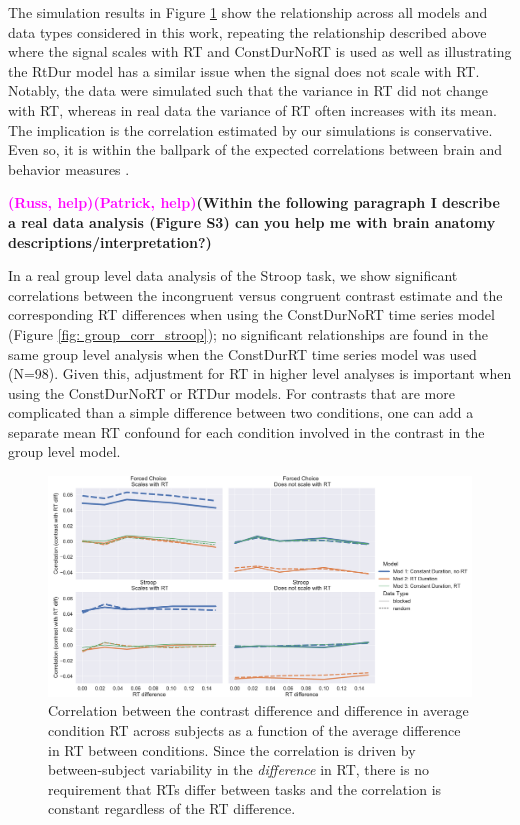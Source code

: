 \documentclass[titlepage,12pt] {article}
\newcommand{\rh}{\textcolor{magenta}{\textbf{(Russ, help)}}}
\newcommand{\ph}{\textcolor{magenta}{\textbf{(Patrick, help)}}}
\begin{document}
The simulation results in Figure \ref{fig:rt-cor} show the relationship across all models and data types considered in this work, repeating the relationship described above where the signal scales with RT and ConstDurNoRT is used as well as illustrating the RtDur model has a similar issue when the signal does not scale with RT.   Notably, the data were simulated such that the variance in RT did not change with RT, whereas in real data the variance of RT often increases with its mean.  The implication is the correlation estimated by our simulations is conservative.  Even so, it is within the ballpark of the expected correlations between brain and behavior measures \citep{marekReproducibleBrainwideAssociation2022}.  

\rh\ph\textbf{(Within the following paragraph I describe a real data analysis (Figure S3) can you help me with brain anatomy descriptions/interpretation?)} 

In a real group level data analysis of the Stroop task, we show significant correlations between the incongruent versus congruent contrast estimate and the corresponding RT differences when using the ConstDurNoRT time series model  (Figure \ref{fig: group_corr_stroop}); no significant relationships are found in the same group level analysis when the ConstDurRT time series model was used (N=98).  Given this, adjustment for RT in higher level analyses is important when using the ConstDurNoRT or RTDur models.  For contrasts that are more complicated than a simple difference between two conditions, one can add a separate mean RT confound for each condition involved in the contrast in the group level model.


\begin{figure}
  \centering
   \includegraphics[width=5in]{Figures/cor_with_rt.pdf}
   \caption{Correlation between the contrast difference and difference in average condition RT across subjects as a function of the average difference in RT between conditions.  Since the correlation is driven by between-subject variability in the \emph{difference} in RT, there is no requirement that RTs differ between tasks and the correlation is constant regardless of the RT difference. }
  \label{fig:rt-cor}
\end{figure}
\end{document}
